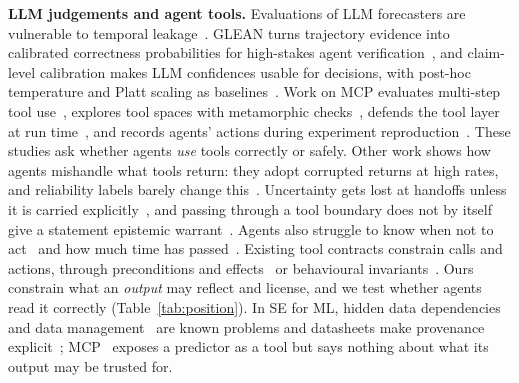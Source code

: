 \documentclass[conference]{IEEEtran}
\begin{document}
\textbf{LLM judgements and agent tools.} Evaluations of LLM forecasters are vulnerable to temporal leakage~\cite{paleka2026pitfalls}. GLEAN turns trajectory evidence into calibrated correctness probabilities for high-stakes agent verification~\cite{zhang2026glean}, and claim-level calibration makes LLM confidences usable for decisions, with post-hoc temperature and Platt scaling as baselines~\cite{abbasli2026claimcal}. Work on MCP evaluates multi-step tool use~\cite{wu2026mcpmark}, explores tool spaces with metamorphic checks~\cite{liu2026sgvef}, defends the tool layer at run time~\cite{yergattikar2026securing}, and records agents' actions during experiment reproduction~\cite{hong2026agentactionbench}. These studies ask whether agents \emph{use} tools correctly or safely. Other work shows how agents mishandle what tools return: they adopt corrupted returns at high rates, and reliability labels barely change this~\cite{yang2026overreliance}. Uncertainty gets lost at handoffs unless it is carried explicitly~\cite{shi2026laundering}, and passing through a tool boundary does not by itself give a statement epistemic warrant~\cite{romanchuk2026semantic}. Agents also struggle to know when not to act~\cite{liu2026agentabstain} and how much time has passed~\cite{cheng2026temporally}. Existing tool contracts constrain calls and actions, through preconditions and effects~\cite{sureshbabu2026contract2tool} or behavioural invariants~\cite{bhardwaj2026abc}. Ours constrain what an \emph{output} may reflect and license, and we test whether agents read it correctly (Table~\ref{tab:position}). In SE for ML, hidden data dependencies~\cite{sculley2015} and data management~\cite{amershi2019} are known problems and datasheets make provenance explicit~\cite{gebru2021}; MCP~\cite{mcp2024} exposes a predictor as a tool but says nothing about what its output may be trusted for.
\end{document}
